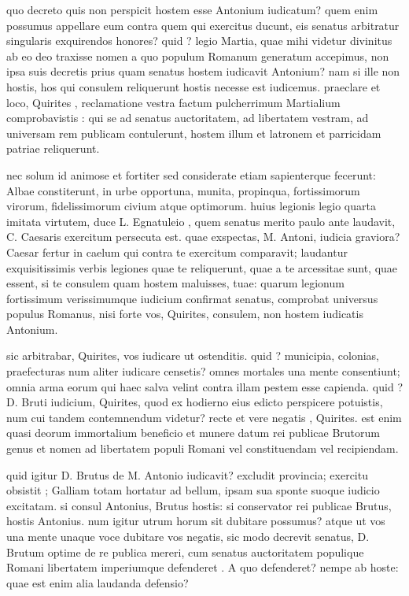  quo decreto quis non perspicit hostem esse Antonium iudicatum? quem enim possumus appellare eum contra quem qui exercitus ducunt, eis senatus arbitratur singularis exquirendos honores? quid ? legio Martia, quae mihi videtur divinitus ab eo deo traxisse nomen a quo populum Romanum generatum accepimus, non ipsa suis decretis prius quam senatus hostem iudicavit Antonium? nam si ille non hostis, hos qui consulem reliquerunt hostis necesse est iudicemus. praeclare et loco, Quirites , reclamatione vestra factum pulcherrimum Martialium comprobavistis : qui se ad senatus auctoritatem, ad libertatem vestram, ad universam rem publicam contulerunt, hostem illum et latronem et parricidam patriae reliquerunt.

 nec solum id animose et fortiter sed considerate etiam sapienterque fecerunt: Albae constiterunt, in urbe opportuna, munita, propinqua, fortissimorum virorum, fidelissimorum civium atque optimorum. huius legionis legio quarta imitata virtutem, duce L. Egnatuleio , quem senatus merito paulo ante laudavit, C. Caesaris exercitum persecuta est. quae exspectas, M. Antoni, iudicia graviora? Caesar fertur in caelum qui contra te exercitum comparavit; laudantur exquisitissimis verbis legiones quae te reliquerunt, quae a te arcessitae sunt, quae essent, si te consulem quam hostem maluisses, tuae: quarum legionum fortissimum verissimumque iudicium confirmat senatus, comprobat universus populus Romanus, nisi forte vos, Quirites, consulem, non hostem iudicatis Antonium.

 sic arbitrabar, Quirites, vos iudicare ut ostenditis. quid ? municipia, colonias, praefecturas num aliter iudicare censetis? omnes mortales una mente consentiunt; omnia arma eorum qui haec salva velint contra illam pestem esse capienda. quid ? D. Bruti iudicium, Quirites, quod ex hodierno eius edicto perspicere potuistis, num cui tandem contemnendum videtur? recte et vere negatis , Quirites. est enim quasi deorum immortalium beneficio et munere datum rei publicae Brutorum genus et nomen ad libertatem populi Romani vel constituendam vel recipiendam.

 quid igitur D. Brutus de M. Antonio iudicavit? excludit provincia; exercitu obsistit ; Galliam totam hortatur ad bellum, ipsam sua sponte suoque iudicio excitatam. si consul Antonius, Brutus hostis: si conservator rei publicae Brutus, hostis Antonius. num igitur utrum horum sit dubitare possumus? atque ut vos una mente unaque voce dubitare vos negatis, sic modo decrevit senatus, D. Brutum optime de re publica mereri, cum senatus auctoritatem populique Romani libertatem imperiumque defenderet . A quo defenderet? nempe ab hoste: quae est enim alia laudanda defensio?

